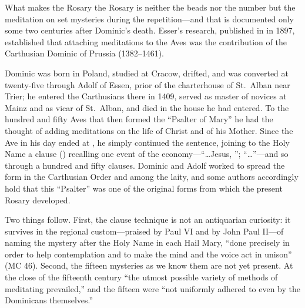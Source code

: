 What makes the Rosary the Rosary is neither the beads nor the number but
the meditation on set mysteries during the repetition---and that is
documented only some two centuries after Dominic's death. Esser's
research, published in  in 1897, established that
attaching meditations to the Aves was the contribution of the Carthusian
Dominic of Prussia (1382--1461).

Dominic was born in Poland, studied at Cracow, drifted, and was
converted at twenty-five through Adolf of Essen, prior of the
charterhouse of St.~Alban near Trier; he entered the Carthusians there
in 1409, served as master of novices at Mainz and as vicar of St.~Alban,
and died in the house he had entered. To the hundred and fifty Aves that
then formed the ``Psalter of Mary'' he had the thought of adding
meditations on the life of Christ and of his Mother. Since the Ave in
his day ended at , he simply continued
the sentence, joining to the Holy Name a clause ()
recalling one event of the economy---``\ldots Jesus, ''; ``\ldots {}''---and so through a hundred and fifty
clauses. Dominic and Adolf worked to spread the form in the Carthusian
Order and among the laity, and some authors accordingly hold that this
``Psalter'' was one of the original forms from which the present Rosary
developed.

Two things follow. First, the clause technique is not an antiquarian
curiosity: it survives in the regional custom---praised by Paul VI and
by John Paul II---of naming the mystery after the Holy Name in each Hail
Mary, ``done precisely in order to help contemplation and to make the
mind and the voice act in unison'' (MC 46). Second, the fifteen
mysteries as we know them are not yet present. At the close of the
fifteenth century ``the utmost possible variety of methods of
meditating prevailed,'' and the fifteen were ``not uniformly adhered to
even by the Dominicans themselves.''

